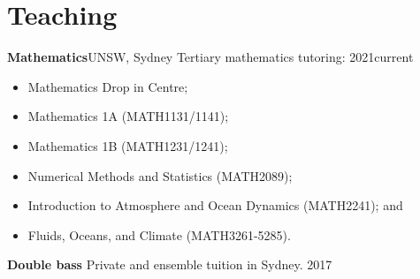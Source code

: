 
\section{Teaching}
\textbf{Mathematics}\hfill UNSW, Sydney
\newline
Tertiary mathematics tutoring: \hfill 2021\textendash current
\begin{itemize}
    \item[--] Mathematics Drop in Centre;
    \item[--] Mathematics 1A (MATH1131/1141);
    \item[--] Mathematics 1B (MATH1231/1241);
    \item[--] Numerical Methods and Statistics (MATH2089);
    \item[--] Introduction to Atmosphere and Ocean Dynamics (MATH2241); and
    \item[--] Fluids, Oceans, and Climate (MATH3261-5285).
\end{itemize}

\textbf{Double bass}
\newline
Private and ensemble tuition in Sydney. \hfill 2017
